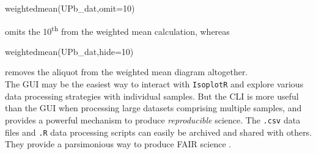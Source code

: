\begin{refsection}
\begin{script}[firstnumber=2]
weightedmean(UPb_dat,omit=10)
\end{script}

\noindent omits the 10\textsuperscript{th} from the weighted mean
calculation, whereas

\begin{script}[firstnumber=2]
weightedmean(UPb_dat,hide=10)
\end{script}

\noindent removes the aliquot from the weighted mean diagram
altogether.\\

The GUI may be the easiest way to interact with \texttt{IsoplotR} and
explore various data processing strategies with individual
samples. But the CLI is more useful than the GUI when processing large
datasets comprising multiple samples, and provides a powerful
mechanism to produce \emph{reproducible} science. The \texttt{.csv}
data files and \texttt{.R} data processing scripts can easily be
archived and shared with others. They provide a parsimonious way to
produce FAIR science \citep{wilkinson2016}.

\printbibliography[heading=subbibliography]
\end{refsection}
